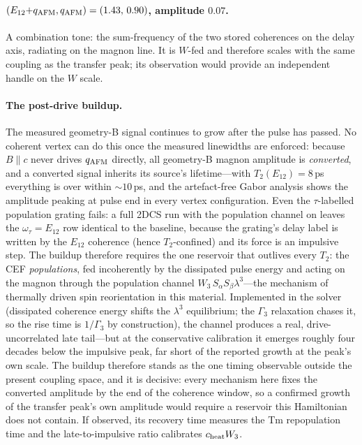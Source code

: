 \documentclass[11pt]{article}
\newcommand{\qafm}{q_{\rm AFM}}
\begin{document}
\paragraph{$(E_{12}{+}\qafm,\qafm)=(1.43,\,0.90)$, amplitude $0.07$.}
A combination tone: the sum-frequency of the two stored coherences on
the delay axis, radiating on the magnon line.  It is $W$-fed and
therefore scales with the same coupling as the transfer peak; its
observation would provide an independent handle on the $W$ scale.

\paragraph{The post-drive buildup.}
The measured geometry-B signal continues to grow after the pulse has
passed.  No coherent vertex can do this once the measured linewidths
are enforced: because $B\!\parallel\!c$ never drives $\qafm$ directly,
all geometry-B magnon amplitude is \emph{converted}, and a converted
signal inherits its source's lifetime---with $T_2(E_{12})=8$\,ps
everything is over within $\sim10$\,ps, and the artefact-free Gabor
analysis shows the amplitude peaking at pulse end in every vertex
configuration.  Even the $\tau$-labelled population grating fails: a
full 2DCS run with the population channel on leaves the
$\omega_\tau=E_{12}$ row identical to the baseline, because the
grating's delay label is written by the $E_{12}$ coherence (hence
$T_2$-confined) and its force is an impulsive step.  The buildup
therefore requires the one reservoir that outlives every $T_2$: the CEF
\emph{populations}, fed incoherently by the dissipated pulse energy and
acting on the magnon through the population channel
$W_3\,S_\alpha S_\beta\lambda^3$---the mechanism of thermally driven
spin reorientation in this material.  Implemented in the solver
(dissipated coherence energy shifts the $\lambda^3$ equilibrium; the
$\Gamma_3$ relaxation chases it, so the rise time is $1/\Gamma_3$ by
construction), the channel produces a real, drive-uncorrelated late
tail---but at the conservative calibration it emerges roughly four
decades below the impulsive peak, far short of the reported growth at
the peak's own scale.  The buildup therefore stands as the one timing
observable outside the present coupling space, and it is decisive:
every mechanism here fixes the converted amplitude by the end of the
coherence window, so a confirmed growth of the transfer peak's own
amplitude would require a reservoir this Hamiltonian does not contain.
If observed, its recovery time measures the Tm repopulation time and
the late-to-impulsive ratio calibrates $c_{\rm heat}W_3$.
\end{document}
